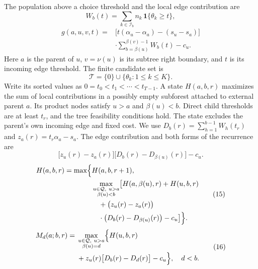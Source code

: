The population above a choice threshold and the local edge contribution are
\begin{equation}
W_b(t)=\sum_{k\in\mathcal I_b}n_k\,\mathbf 1\{\theta_k\ge t\},
\label{eq:s4_8}
\tag{10}
\end{equation}
\begin{equation}
\begin{aligned}
g(a,u,v,t)={}&\bigl[t(\alpha_u-\alpha_a)-(s_u-s_a)\bigr]\\
&\cdot\sum_{b=\beta(u)}^{\beta(v)-1}W_b(t)-c_u.
\end{aligned}
\label{eq:s4_9}
\tag{11}
\end{equation}
Here $a$ is the parent of $u$, $v=\nu(u)$ is its subtree right boundary, and $t$ is its incoming edge threshold. The finite candidate set is
\begin{equation}
\mathcal T=\{0\}\cup\{\theta_k:1\le k\le K\}.
\label{eq:s4_11}
\tag{13}
\end{equation}
Write its sorted values as $0=t_0<t_1<\cdots<t_{T-1}$. A state $H(a,b,r)$ maximizes the sum of local contributions in a possibly empty subforest attached to external parent $a$. Its product nodes satisfy $u>a$ and $\beta(u)<b$. Direct child thresholds are at least $t_r$, and the tree feasibility conditions hold. The state excludes the parent's own incoming edge and fixed cost. We use $D_b(r)=\sum_{h=1}^{b-1}W_h(t_r)$ and $z_a(r)=t_r\alpha_a-s_a$. The edge contribution and both forms of the recurrence are
\begin{equation}
\bigl[z_u(r)-z_a(r)\bigr]
\bigl[D_b(r)-D_{\beta(u)}(r)\bigr]-c_u.
\label{eq:s5_3}
\tag{14}
\end{equation}
\begin{equation}
\begin{aligned}
H(a,b,r)=\max\Bigl\{&H(a,b,r+1),\\
&\max_{\substack{u\in\mathcal Q,\ u>a\\\beta(u)<b}}\bigl[H(a,\beta(u),r)+H(u,b,r)\\
&\quad+\bigl(z_u(r)-z_a(r)\bigr)\\
&\quad\cdot\bigl(D_b(r)-D_{\beta(u)}(r)\bigr)-c_u\bigr]\Bigr\}.
\end{aligned}
\label{eq:s5_4}
\tag{15}
\end{equation}
\begin{equation}
\begin{aligned}
M_d(a;b,r)={}&\max_{\substack{u\in\mathcal Q,\ u>a\\\beta(u)=d}}\Bigl\{H(u,b,r)\\
&+z_u(r)\bigl[D_b(r)-D_d(r)\bigr]-c_u\Bigr\},\quad d<b.
\end{aligned}
\label{eq:s5_5}
\tag{16}
\end{equation}
